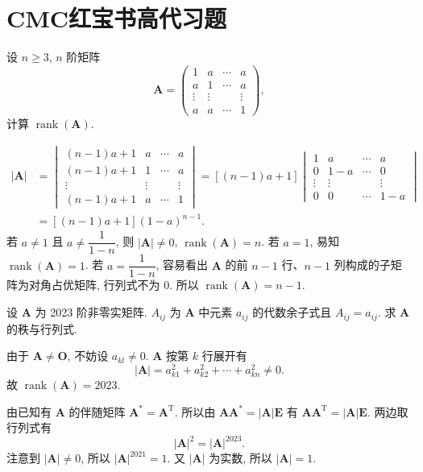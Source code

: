 \documentclass[../../main.tex]{subfiles}
\begin{document}
\section{CMC红宝书高代习题}

\begin{example}
设 \(n \geqslant 3\), \(n\) 阶矩阵
\[
\boldsymbol{A} = \begin{pmatrix} 1 & a & \cdots & a \\ a & 1 & \cdots & a \\ \vdots & \vdots & & \vdots \\ a & a & \cdots & 1 \end{pmatrix},
\]
计算 \(\operatorname{rank}(\boldsymbol{A})\).
\end{example}
\begin{solution}
\[
\begin{aligned}
|\boldsymbol{A}| &= \begin{vmatrix} (n - 1)a + 1 & a & \cdots & a \\ (n - 1)a + 1 & 1 & \cdots & a \\ \vdots & \vdots & & \vdots \\ (n - 1)a + 1 & a & \cdots & 1 \end{vmatrix} = [(n - 1)a + 1] \begin{vmatrix} 1 & a & \cdots & a \\ 0 & 1 - a & \cdots & 0 \\ \vdots & \vdots & & \vdots \\ 0 & 0 & \cdots & 1 - a \end{vmatrix} \\
&= [(n - 1)a + 1](1 - a)^{n - 1}.
\end{aligned}
\]
若 \(a \neq 1\) 且 \(a \neq \dfrac{1}{1 - n}\), 则 \(|\boldsymbol{A}| \neq 0\), \(\operatorname{rank}(\boldsymbol{A}) = n\). 若 \(a = 1\), 易知 \(\operatorname{rank}(\boldsymbol{A}) = 1\). 若 \(a = \dfrac{1}{1 - n}\), 容易看出 \(\boldsymbol{A}\) 的前 \(n - 1\) 行、\(n - 1\) 列构成的子矩阵为对角占优矩阵, 行列式不为 0. 所以 \(\operatorname{rank}(\boldsymbol{A}) = n - 1\).
\end{solution}

\begin{example}
设 \(\boldsymbol{A}\) 为 2023 阶非零实矩阵. \(A_{ij}\) 为 \(\boldsymbol{A}\) 中元素 \(a_{ij}\) 的代数余子式且 \(A_{ij} = a_{ij}\). 求 \(\boldsymbol{A}\) 的秩与行列式.
\end{example}
\begin{solution}
由于 \(\boldsymbol{A} \neq \boldsymbol{O}\), 不妨设 \(a_{kl} \neq 0\). \(\boldsymbol{A}\) 按第 \(k\) 行展开有
\[
|\boldsymbol{A}| = a_{k1}^2 + a_{k2}^2 + \cdots + a_{kn}^2 \neq 0.
\]
故 \(\operatorname{rank}(\boldsymbol{A}) = 2023\).

由已知有 \(\boldsymbol{A}\) 的伴随矩阵 \(\boldsymbol{A}^* = \boldsymbol{A}^\mathrm{T}\). 所以由 \(\boldsymbol{A}\boldsymbol{A}^* = |\boldsymbol{A}|\boldsymbol{E}\) 有 \(\boldsymbol{A}\boldsymbol{A}^\mathrm{T} = |\boldsymbol{A}|\boldsymbol{E}\). 两边取行列式有
\[
|\boldsymbol{A}|^2 = |\boldsymbol{A}|^{2023}.
\]
注意到 \(|\boldsymbol{A}| \neq 0\), 所以 \(|\boldsymbol{A}|^{2021} = 1\). 又 \(|\boldsymbol{A}|\) 为实数, 所以 \(|\boldsymbol{A}| = 1\).
\end{solution}
\end{document}
